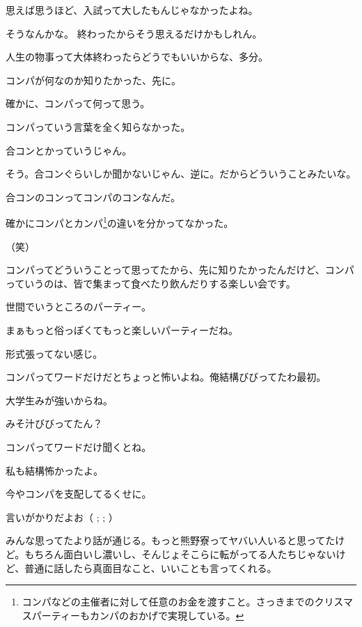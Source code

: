 \begin{multicols}{2}
思えば思うほど、入試って大したもんじゃなかったよね。

そうなんかな。  終わったからそう思えるだけかもしれん。

人生の物事って大体終わったらどうでもいいからな、多分。


\vspace{15mm}

コンパが何なのか知りたかった、先に。

確かに、コンパって何って思う。

コンパっていう言葉を全く知らなかった。

合コンとかっていうじゃん。

そう。合コンぐらいしか聞かないじゃん、逆に。だからどういうことみたいな。

合コンのコンってコンパのコンなんだ。

確かにコンパとカンパ\footnote{コンパなどの主催者に対して任意のお金を渡すこと。さっきまでのクリスマスパーティーもカンパのおかげで実現している。}の違いを分かってなかった。

（笑）

コンパってどういうことって思ってたから、先に知りたかったんだけど、コンパっていうのは、皆で集まって食べたり飲んだりする楽しい会です。

世間でいうところのパーティー。

まぁもっと俗っぽくてもっと楽しいパーティーだね。

形式張ってない感じ。

コンパってワードだけだとちょっと怖いよね。俺結構びびってたわ最初。

大学生みが強いからね。

みそ汁びびってたん？

コンパってワードだけ聞くとね。

私も結構怖かったよ。

今やコンパを支配してるくせに。

言いがかりだよお（ ;  ; ）

みんな思ってたより話が通じる。もっと熊野寮ってヤバい人いると思ってたけど。もちろん面白いし濃いし、そんじょそこらに転がってる人たちじゃないけど、普通に話したら真面目なこと、いいことも言ってくれる。


\end{multicols}
